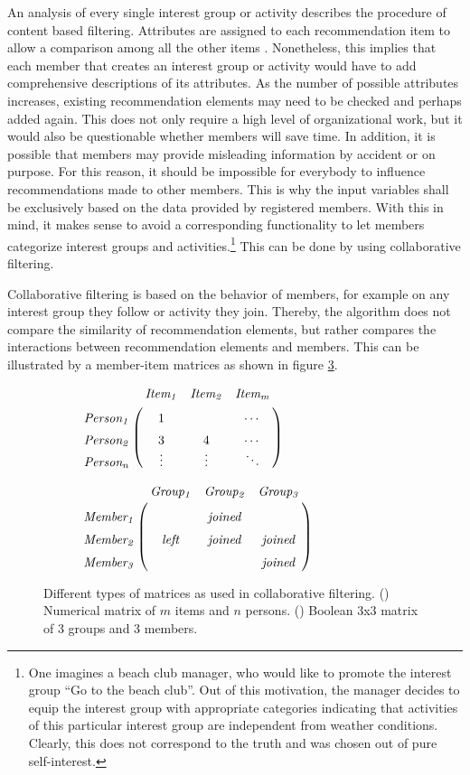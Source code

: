 \documentclass[12pt,numbers=noenddot,parskip,bibliography=totocnumbered,listof=totocnumbered,draft]{scrreprt}
\begin{document}
An analysis of every single interest group or activity describes the procedure of content based filtering. Attributes are assigned to each recommendation item to allow a comparison among all the other items \citep[p.42]{klahold2009}. Nonetheless, this implies that each member that creates an interest group or activity would have to add comprehensive descriptions of its attributes. As the number of possible attributes increases, existing recommendation elements may need to be checked and perhaps added again. This does not only require a high level of organizational work, but it would also be questionable whether members will save time. In addition, it is possible that members may provide misleading information by accident or on purpose. For this reason, it should be impossible for everybody to influence recommendations made to other members. This is why the input variables shall be exclusively based on the data provided by registered members. With this in mind, it makes sense to avoid a corresponding functionality to let members categorize interest groups and activities.\footnote{One imagines a beach club manager, who would like to promote the interest group ``Go to the beach club''. Out of this motivation, the manager decides to equip the interest group with appropriate categories indicating that activities of this particular interest group are independent from weather conditions. Clearly, this does not correspond to the truth and was chosen out of pure self-interest.} This can be done by using collaborative filtering. 

Collaborative filtering is based on the behavior of members, for example on any interest group they follow or activity they join. \citep[p.62]{klahold2009} Thereby, the algorithm does not compare the similarity of recommendation elements, but rather compares the interactions between recommendation elements and members. This can be illustrated by a member-item matrices as shown in figure \ref{matrix}.

\begin{figure}
\begin{subfigure}[t]{0.5\textwidth}
\centering
$\bordermatrix{~ & \mathit{Item_1} & \mathit{Item_2} & \mathit{Item_m} \cr
\vphantom{\vdots}\mathit{Person_1} & 1 &  & \cdots  \cr
\vphantom{\vdots}\mathit{Person_2} & 3 & 4 & \cdots \cr
\vphantom{\vdots}\mathit{Person_n} & \vdotswithin{3} & \vdotswithin{4} & \ddots  }$
\caption{}
\label{nummatrix}
\end{subfigure}%
\begin{subfigure}[t]{0.5\textwidth}
\centering
$\bordermatrix{~ & \mathit{Group_1} & \mathit{Group_2} & \mathit{Group_3} \cr
\vphantom{\vdots}\mathit{Member_1} &  & \mathit{joined} &  \cr
\vphantom{\vdots}\mathit{Member_2} & \mathit{left} & \mathit{joined} & \mathit{joined} \cr
\vphantom{\vdots}\mathit{Member_3} & &  & \mathit{joined} }$
\caption{}
\label{boolmatrix}
\end{subfigure}
\caption[Member-item matrices of collaborative filtering]{Different types of matrices as used in collaborative filtering. () Numerical matrix of $m$ items and $n$ persons. () Boolean 3x3 matrix of 3 groups and 3 members.}
\label{matrix}
\end{figure}
\end{document}
